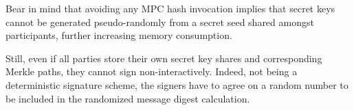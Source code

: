 Bear in mind that avoiding any MPC hash invocation implies that \WOTS secret keys cannot be generated pseudo-randomly from a secret seed shared amongst participants, further increasing memory consumption.
 
Still, even if all parties store their own \WOTS secret key shares and corresponding Merkle paths, they cannot sign non-interactively.
Indeed, \XMSS not being a deterministic signature scheme, the signers have to agree on a random number to be included in the randomized message digest calculation.
